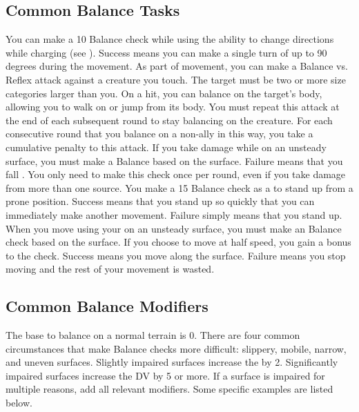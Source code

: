   \subsection{Common Balance Tasks}
     You can make a  10 Balance check while using the  ability to change directions while charging (see ).
    Success means you can make a single turn of up to 90 degrees during the movement.
     As part of movement, you can make a Balance vs. Reflex attack against a creature you touch.
    The target must be two or more size categories larger than you.
    On a hit, you can balance on the target's body, allowing you to walk on or jump from its body.
    You must repeat this attack at the end of each subsequent round to stay balancing on the creature.
    For each consecutive round that you balance on a non-ally in this way, you take a cumulative  penalty to this attack.
     If you take damage while on an unsteady surface, you must make a Balance  based on the surface.
    Failure means that you fall \prone.
    You only need to make this check once per round, even if you take damage from more than one source.
     You make a  15 Balance check as a  to stand up from a prone position.
    Success means that you stand up so quickly that you can immediately make another movement.
    Failure simply means that you stand up.
     When you move using your  on an unsteady surface, you must make an Balance check based on the surface.
    If you choose to move at half speed, you gain a  bonus to the check.
    Success means you move along the surface.
    Failure means you stop moving and the rest of your movement is wasted.

  \subsection{Common Balance Modifiers}

    The base  to balance on a normal terrain is 0.
    There are four common circumstances that make Balance checks more difficult: slippery, mobile, narrow, and uneven surfaces.
    Slightly impaired surfaces increase the  by 2.
    Significantly impaired surfaces increase the DV by 5 or more.
    If a surface is impaired for multiple reasons, add all relevant modifiers.
    Some specific examples are listed below.

